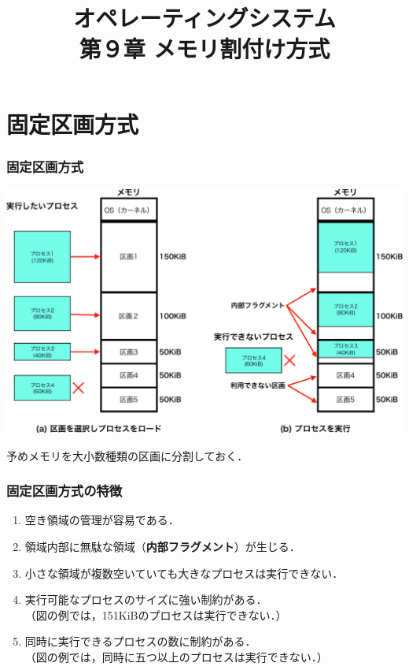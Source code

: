 \documentclass{beamer}                   %
\begin{document}
\title[主記憶]{オペレーティングシステム\\第９章 メモリ割付け方式}
\date{}

\begin{frame}
  \titlepage
\end{frame}


\section{固定区画方式}
\begin{frame}
  \frametitle{固定区画方式}
  \begin{center}
    \includegraphics[scale=0.45]{Fig/fixedPartition-crop.pdf}\\
  \end{center}
  予めメモリを大小数種類の区画に分割しておく．
\end{frame}

\begin{frame}
  \frametitle{固定区画方式の特徴}
  \begin{enumerate}
  \item 空き領域の管理が容易である．
  \item 領域内部に無駄な領域（{\bf 内部フラグメント}）が生じる．
  \item 小さな領域が複数空いていても大きなプロセスは実行できない．
  \item 実行可能なプロセスのサイズに強い制約がある．\\
    （図の例では，151KiBのプロセスは実行できない．）
  \item 同時に実行できるプロセスの数に制約がある．\\
    （図の例では，同時に五つ以上のプロセスは実行できない．）
  \end{enumerate}
\end{frame}
\end{document}
